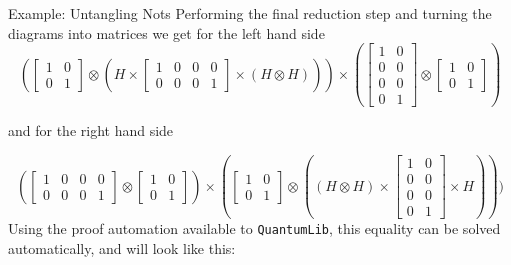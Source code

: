\documentclass[final]{beamer}
\newlength{\colwidth}
\newcommand{\QLib}{\texttt{QuantumLib}\xspace}
\begin{document}
\begin{frame}[t, fragile]
\begin{columns}[t]
\begin{column}{\colwidth}
\begin{block}{Example: Untangling Nots}
    Performing the final reduction step and turning the diagrams into matrices we get for the left hand side
    \[
      (\begin{bmatrix} 
         1 & 0 \\ 
         0 & 1 
       \end{bmatrix} 
       \otimes 
       (H 
       \times 
       \begin{bmatrix} 
         1 & 0 & 0 & 0 \\
         0 & 0 & 0 & 1 
       \end{bmatrix} 
       \times 
       (H \otimes H)))
       \times 
      (\begin{bmatrix}
         1 & 0 \\
         0 & 0 \\
         0 & 0 \\
         0 & 1
       \end{bmatrix}
       \otimes
       \begin{bmatrix}
         1 & 0 \\
         0 & 1 
       \end{bmatrix})
     \]
     \begin{center}{ and for the right hand side }\end{center}
     \[
       (\begin{bmatrix} 
         1 & 0 & 0 & 0 \\
         0 & 0 & 0 & 1 
       \end{bmatrix} 
       \otimes
       \begin{bmatrix}
         1 & 0 \\
         0 & 1 
       \end{bmatrix})
       \times (
       \begin{bmatrix}
         1 & 0 \\
         0 & 1 
       \end{bmatrix}
       \otimes
       ( (H \otimes H) \times
       \begin{bmatrix}
         1 & 0 \\
         0 & 0 \\
         0 & 0 \\
         0 & 1
       \end{bmatrix}
       \times H))
       )
     \]
     Using the proof automation available to \QLib, this equality can be solved automatically, and will look like this:


\end{block}
\end{column}
\end{columns}
\end{frame}
\end{document}
